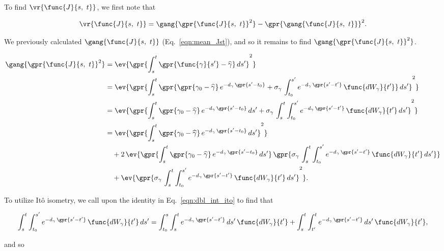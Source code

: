 To find $\vr{\func{J}{s,\ t}}$, we first note that

\begin{equation}
	\vr{\func{J}{s,\ t}} = \gang{\gpr{\func{J}{s,\ t}}^2} - \gpr{\gang{\func{J}{s,\ t}}}^2.
\end{equation}

We previously calculated $\gang{\func{J}{s,\ t}}$ (Eq.~\ref{eqn:mean_Jst}), and so it remains to find $\gang{\gpr{\func{J}{s,\ t}}^2}$.

\begin{align}
    \gang{\gpr{\func{J}{s,\ t}}^2} &= \ev{\gpr{\int_{s}^{t} \gpr{\func{\gamma}{s'} - \widehat{\gamma}}\,ds'}^2} \nonumber \\
    	&= \ev{\gpr{\int_{s}^{t} \gpr{\gpr{\gamma_0 - \widehat{\gamma}}\,e^{-d_{\gamma}\,\gpr{s' - t_0}} + \sigma_{\gamma}\,\int_{t_{0}}^{s'} e^{-d_{\gamma}\,\gpr{s' - t'}}\,\func{d{W}_{\gamma}}{t'}}\,ds'}^2} \nonumber \\
    	&= \ev{\gpr{\int_{s}^{t} \gpr{\gamma_0 - \widehat{\gamma}}\,e^{-d_{\gamma}\,\gpr{s' - t_0}}\,ds' + \sigma_{\gamma}\,\int_{s}^{t} \int_{t_{0}}^{s'} e^{-d_{\gamma}\,\gpr{s' - t'}}\,\func{d{W}_{\gamma}}{t'}\,ds'}^2} \nonumber \\
    	&= \ev{\gpr{\int_{s}^{t} \gpr{\gamma_0 - \widehat{\gamma}}\,e^{-d_{\gamma}\,\gpr{s' - t_0}}\,ds'}^2} \nonumber \\
    		&\quad + 2\,\ev{\gpr{\int_{s}^{t} \gpr{\gamma_0 - \widehat{\gamma}}\,e^{-d_{\gamma}\,\gpr{s' - t_0}}\,ds'}\,\gpr{\sigma_{\gamma}\,\int_{s}^{t} \int_{t_{0}}^{s'} e^{-d_{\gamma}\,\gpr{s' - t'}}\,\func{d{W}_{\gamma}}{t'}\,ds'}} \nonumber \\
    		&\quad + \ev{\gpr{\sigma_{\gamma}\,\int_{s}^{t} \int_{t_{0}}^{s'} e^{-d_{\gamma}\,\gpr{s' - t'}}\,\func{d{W}_{\gamma}}{t'}\,ds'}^2}.
\end{align}

To utilize It\^o isometry, we call upon the identity in Eq.~\ref{eqn:dbl_int_ito} to find that

\begin{equation}
	\int_{s}^{t} \int_{t_{0}}^{s'} e^{-d_{\gamma}\,\gpr{s' - t'}}\,\func{d{W}_{\gamma}}{t'}\,ds' = \int_{t_{0}}^{s} \int_{s}^{t} e^{-d_{\gamma}\,\gpr{s' - t'}}\,ds'\,\func{d{W}_{\gamma}}{t'} + \int_{s}^{t} \int_{t'}^{t} e^{-d_{\gamma}\,\gpr{s' - t'}}\,ds'\,\func{d{W}_{\gamma}}{t'},
\end{equation}

and so 

